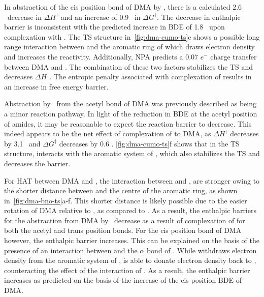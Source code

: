 In abstraction of the cis position  bond of DMA by \cumo, there is a calculated 2.6 \kcalmol\ decrease in $\Delta H^\ddagger$ and an increase of 0.9 \kcalmol\ in $\Delta G^\ddagger$. The decrease in enthalpic barrier is inconsistent with the predicted increase in BDE of 1.8 \kcalmol\ upon complexation with . The TS structure in~\ref{fig:dma-cumo-ts}c shows a possible long range interaction between  and the aromatic ring of \cumo which draws electron density and increases the reactivity. Additionally, NPA predicts a 0.07 $e^-$ charge transfer between DMA and . The combination of these two factors stabilizes the TS and decreases $\Delta H^\ddagger$. The entropic penalty associated with complexation of  results in an increase in free energy barrier.

Abstraction by \cumo\ from the acetyl  bond of DMA was previously described as being a minor reaction pathway.\cite{Salamone2013} In light of the reduction in BDE at the acetyl position of amides, it may be reasonable to expect the reaction barrier to decrease. This indeed appears to be the net effect of complexation of  to DMA, as $\Delta H^\ddagger$ decreases by 3.1 \kcalmol\ and $\Delta G^\ddagger$ decreases by 0.6 \kcalmol. \ref{fig:dma-cumo-ts}f shows that in the TS structure,  interacts with the aromatic system of \cumo, which also stabilizes the TS and decreases the barrier.

For HAT between DMA and \bno, the interaction between  and \bno, are stronger owing to the shorter distance between  and the centre of the aromatic ring, as shown in~\ref{fig:dma-bno-ts}a-f. This shorter distance is likely possible due to the easier rotation of DMA relative to \bno, as compared to \cumo. As a result, the enthalpic barriers for the abstraction from DMA by \bno\ decrease as a result of complexation of  for both the acetyl and trans position  bonds. For the cis position  bond of DMA however, the enthalpic barrier increases. This can be explained on the basis of the presence of an interaction between  and the $\alpha$ bond of \bno. While  withdraws electron density from the aromatic system of \bno,  is able to donate electron density back to \bno, counteracting the effect of the interaction of . As a result, the enthalpic barrier increases as predicted on the basis of the increase of the cis position  BDE of DMA.

